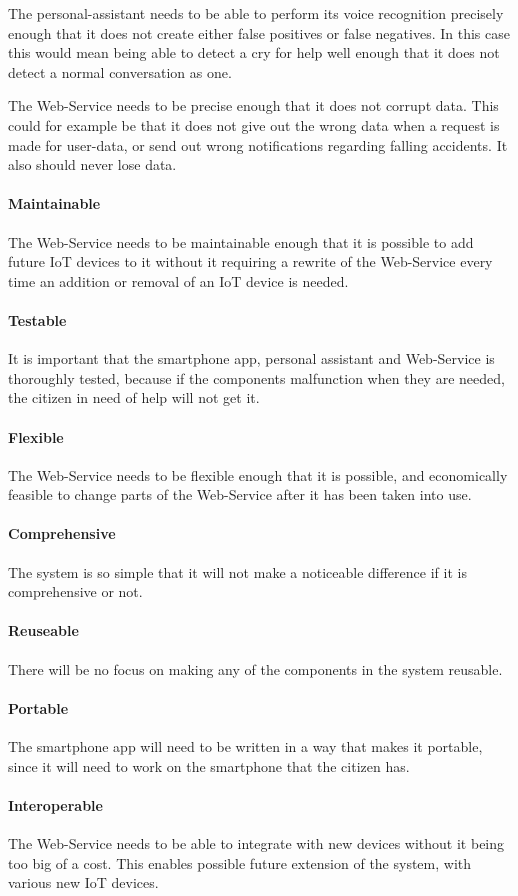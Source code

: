 The personal-assistant needs to be able to perform its voice recognition precisely enough that it does not create either false positives or false negatives. In this case this would mean being able to detect a cry for help well enough that it does not detect a normal conversation as one.

The Web-Service needs to be precise enough that it does not corrupt data. This could for example be that it does not give out the wrong data when a request is made for user-data, or send out wrong notifications regarding falling accidents. It also should never lose data.

\paragraph{Maintainable}
The Web-Service needs to be maintainable enough that it is possible to add future IoT devices to it without it requiring a rewrite of the Web-Service every time an addition or removal of an IoT device is needed.

\paragraph{Testable}
It is important that the smartphone app, personal assistant and Web-Service is thoroughly tested, because if the components malfunction when they are needed, the citizen in need of help will not get it.

\paragraph{Flexible}
The Web-Service needs to be flexible enough that it is possible, and economically feasible to change parts of the Web-Service after it has been taken into use.

\paragraph{Comprehensive}
The system is so simple that it will not make a noticeable difference if it is comprehensive or not.

\paragraph{Reuseable}
There will be no focus on making any of the components in the system reusable.

\paragraph{Portable}
The smartphone app will need to be written in a way that makes it portable, since it will need to work on the smartphone that the citizen has. 

\paragraph{Interoperable}
The Web-Service needs to be able to integrate with new devices without it being too big of a cost. This enables possible future extension of the system, with various new IoT devices.
